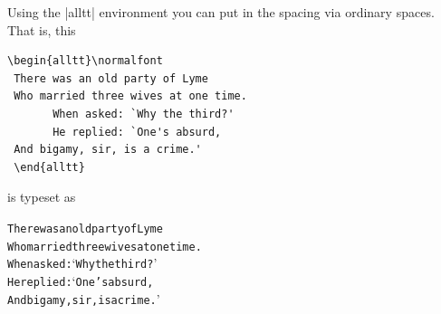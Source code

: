  Using the |alltt| environment you can put in the spacing via ordinary
 spaces. That is, this

\begin{lstlisting}[language={[common]TeX},% 
                           alsolanguage={[LaTeX]TeX},% 
                           alsolanguage={[primitive]TeX},%
                           alsolanguage={extras}]
 \begin{alltt}\normalfont
 There was an old party of Lyme
 Who married three wives at one time.
       When asked: `Why the third?' 
       He replied: `One's absurd, 
 And bigamy, sir, is a crime.'
 \end{alltt}
 \end{lstlisting}

 is typeset as

 \begin{alltt}
 \normalfont
 There was an old party of Lyme
 Who married three wives at one time.
       When asked: `Why the third?' 
       He replied: `One's absurd, 
 And bigamy, sir, is a crime.'
 \end{alltt}


\begin{codeexample}[]
\end{codeexample}







